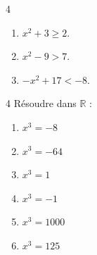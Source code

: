 {\begin{Exercice}
\begin{multicols}{4}
\begin{enumerate}[itemsep=1.5em]
	\item \begin{minipage}[t]{\linewidth} $x^2 +3\geqslant 2$.\end{minipage}
	\item \begin{minipage}[t]{\linewidth} $x^2-9>7$.\end{minipage}
	\item \begin{minipage}[t]{\linewidth} $-x^2+17<-8$.\end{minipage}
\end{enumerate}
\end{multicols}
\end{Exercice}

\begin{Exercice}%
\leavevmode\vspace{-\baselineskip}

\begin{multicols}{4}
Résoudre dans $\mathbb{R}$ :
\begin{enumerate}[itemsep=1em]
	\item \begin{minipage}[t]{\linewidth} $x^3=-8$\\\end{minipage}
	\item \begin{minipage}[t]{\linewidth}$x^3=-64$\\\end{minipage}
	\item \begin{minipage}[t]{\linewidth}$x^3=1$\\\end{minipage}
	\item \begin{minipage}[t]{\linewidth}$x^3=-1$\\\end{minipage}
	\item \begin{minipage}[t]{\linewidth}$x^3=1000$\\\end{minipage}
	\item \begin{minipage}[t]{\linewidth}$x^3=125$\\\end{minipage}
	

\end{enumerate}
\end{multicols}
\end{Exercice}}
